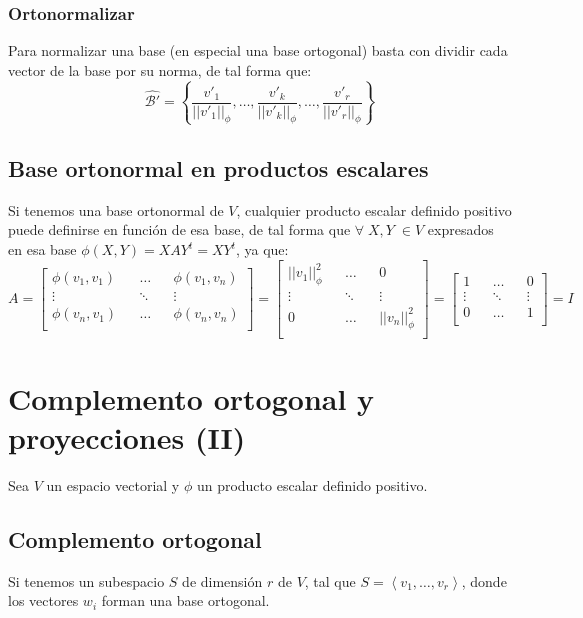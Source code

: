 \documentclass{preset}
\begin{document}
\vspace{-15pt}
\subsubsection{Ortonormalizar}
Para normalizar una base (en especial una base ortogonal) basta con dividir cada vector de la base por su norma, de tal forma que: \[\hat{\mathcal{B}'}=\left\{\frac{v'_1}{||v'_1||_\phi},\dots,\frac{v'_k}{||v'_k||_\phi},\dots,\frac{v'_r}{||v'_r||_\phi}\right\}\]

\vspace{-15pt}
\subsection{Base ortonormal en productos escalares}
Si tenemos una base ortonormal de $V$, cualquier producto escalar definido positivo puede definirse en función de esa base, de tal forma que $\forall \; X,Y \; \in V$ expresados en esa base $\phi(X,Y)=XAY^t=XY^t$, ya que:
\[ A=\left[\begin{matrix}
\phi(v_1,v_1) && \dots && \phi(v_1,v_n) \\
\vdots && \ddots && \vdots\\
\phi(v_n,v_1) && \dots && \phi(v_n,v_n) \\
\end{matrix}\right]=\left[\begin{matrix}
||v_1||_\phi^2 && \dots && 0 \\
\vdots && \ddots && \vdots\\
0 && \dots && ||v_n||_\phi^2 \\
\end{matrix}\right]=\left[\begin{matrix}
1 && \dots && 0 \\
\vdots && \ddots && \vdots\\
0 && \dots && 1 \\
\end{matrix}\right] = I\]

\vspace{-15pt}
\section{Complemento ortogonal y proyecciones (II)}
Sea $V$ un espacio vectorial y $\phi$ un producto escalar definido positivo.

\vspace{-15pt}
\subsection{Complemento ortogonal}
Si tenemos un subespacio $S$ de dimensión $r$ de $V$, tal que $S=\left<v_1,\dots,v_r\right>$, donde los vectores $w_i$ forman una base ortogonal.
\end{document}
